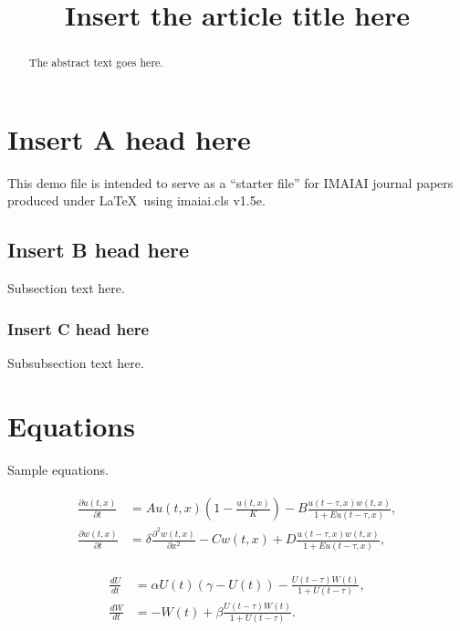 \documentclass{cta-author}%
\begin{document}
\title{Insert the article title here}

\author{%
}

\address{%
}

\begin{abstract}
The abstract text goes here.
\end{abstract}

\maketitle

\section{Insert A head here}
This demo file is intended to serve as a ``starter file''
for IMAIAI journal papers produced under \LaTeX\ using
imaiai.cls v1.5e.

\subsection{Insert B head here}
Subsection text here.


\subsubsection{Insert C head here}
Subsubsection text here.

\section{Equations}

Sample equations.

\begin{align}\label{1.1}
\begin{split}
\frac{\partial u(t,x)}{\partial t} &= Au(t,x) \left(1-\frac{u(t,x)}{K}\right)-B\frac{u(t-\tau,x) w(t,x)}{1+Eu(t-\tau,x)},\\
\frac{\partial w(t,x)}{\partial t} &=\delta \frac{\partial^2w(t,x)}{\partial x^2}-Cw(t,x)+D\frac{u(t-\tau,x)w(t,x)}{1+Eu(t-\tau,x)},
\end{split}
\end{align}

\begin{align}\label{1.2}
\begin{split}
\frac{dU}{dt} &=\alpha U(t)(\gamma -U(t))-\frac{U(t-\tau)W(t)}{1+U(t-\tau)},\\
\frac{dW}{dt} &=-W(t)+\beta\frac{U(t-\tau)W(t)}{1+U(t-\tau)}.
\end{split}
\end{align}
\end{document}
